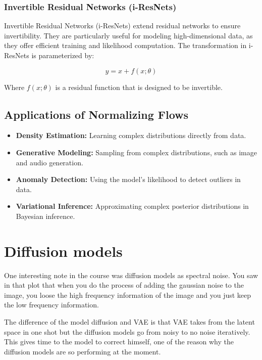 \documentclass{article}
\begin{document}
\subsubsection{Invertible Residual Networks (i-ResNets)}
Invertible Residual Networks (i-ResNets) extend residual networks to ensure invertibility. They are particularly useful for modeling high-dimensional data, as they offer efficient training and likelihood computation. The transformation in i-ResNets is parameterized by:

\[
y = x + f(x; \theta)
\]

Where \( f(x; \theta) \) is a residual function that is designed to be invertible.

\subsection{Applications of Normalizing Flows}

\begin{itemize}
    \item \textbf{Density Estimation:} Learning complex distributions directly from data.
    \item \textbf{Generative Modeling:} Sampling from complex distributions, such as image and audio generation.
    \item \textbf{Anomaly Detection:} Using the model's likelihood to detect outliers in data.
    \item \textbf{Variational Inference:} Approximating complex posterior distributions in Bayesian inference.
\end{itemize}

\clearpage\newpage

\section{Diffusion models} \label{sec:diffusion}


One interesting note in the course was diffusion models as spectral noise. You saw in that plot that when you do the process of adding the gaussian noise to the image, you loose the high frequency information of the image and you just keep the low frequency information.

The difference of the model diffusion and VAE is that VAE takes from the latent space in one shot but the diffusion models go from noisy to no noise iteratively. This gives time to the model to correct himself, one of the reason why the diffusion models are so performing at the moment.
\end{document}
